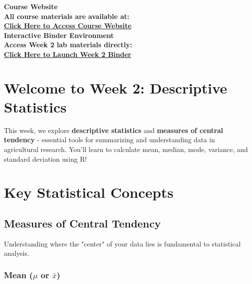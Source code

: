 \documentclass[11pt,a4paper]{article}
\begin{document}
\begin{tcolorbox}[colback=accentgreen!20, colframe=primarygreen, boxrule=2pt, arc=5pt, title={\textbf{\Large Essential Course Resources}}]
\centering
\textbf{\Large Course Website}\\[0.5cm]
\textcolor{primarygreen}{\textbf{All course materials are available at:}}\\[0.3cm]
\href{https://mohammadrezanarimaniucdavis.github.io/PLS120-Statistics-Lab-Materials/}{{\textbf{\Large \textcolor{primarygreen}{\underline{Click Here to Access Course Website}}}}}\\[0.8cm]

\textbf{\Large Interactive Binder Environment}\\[0.5cm]
\textcolor{primarygreen}{\textbf{Access Week 2 lab materials directly:}}\\[0.3cm]
\href{https://mybinder.org/v2/gh/MohammadrezaNarimaniUCDavis/PLS120-Statistics-Lab-Materials/binder-week2}{{\textbf{\Large \textcolor{primarygreen}{\underline{Click Here to Launch Week 2 Binder}}}}}
\end{tcolorbox}

\section{Welcome to Week 2: Descriptive Statistics}

This week, we explore \textbf{descriptive statistics} and \textbf{measures of central tendency} - essential tools for summarizing and understanding data in agricultural research. You'll learn to calculate mean, median, mode, variance, and standard deviation using R!

\section{Key Statistical Concepts}

\subsection{Measures of Central Tendency}

Understanding where the "center" of your data lies is fundamental to statistical analysis.

\subsubsection{\texorpdfstring{Mean ($\mu$ or $\bar{x}$)}{Mean (mu or x-bar)}}
\end{document}
